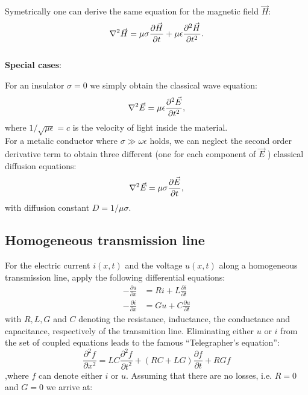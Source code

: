 \documentclass[10pt,a4paper]{report}
\def\vlap{\ensuremath\nabla^2}
\begin{document}
Symetrically one can derive the same equation for the magnetic field $\vec{H}$:
\begin{equation}
  \label{eq:magneticwavebase}
  \vlap\vec{H} =  \mu\sigma\frac{\partial \vec{H}}{\partial t}+\mu\epsilon \frac{\partial^2 \vec{H}}{\partial t^2}.
\end{equation}
\\

\textbf{Special cases}:

For an insulator $\sigma = 0$ we simply obtain the classical wave equation:
\begin{equation*}
  \vlap \vec{E} = \mu\epsilon \frac{\partial^2 \vec{E}}{\partial t^2},
\end{equation*}
where $1/\sqrt{\mu\epsilon} = c$ is the velocity of light inside the material. \\

For a metalic conductor where $\sigma \gg \omega \epsilon$ holds, we can neglect the second order derivative term to obtain three different (one for each component of $\vec{E}$ ) classical diffusion equations:
\begin{equation}
  \vlap \vec{E} = \mu\sigma \frac{\partial \vec{E}}{\partial t},
\end{equation}
with diffusion constant $D = 1/\mu\sigma$. 

\subsection{Homogeneous transmission line}
For the electric current $i(x,t)$ and the voltage $u(x,t)$ along a homogeneous transmission line, apply the following differential equations:
\begin{align}
  -\frac{\partial u}{\partial x} &= R i + L \frac{\partial i}{\partial t} \\
  -\frac{\partial i}{\partial x} &= G u + C \frac{\partial u}{\partial t} 
\end{align}
with $R, L , G $ and $C$ denoting the resistance, inductance, the conductance and capacitance, respectively of the transmition line. Eliminating either $u$ or $i$ from the set of coupled equations leads to the famous ``Telegrapher's equation'':
\begin{equation}
  \label{eq:telegrapherequation}
\frac{\partial^2 f}{\partial x^2} = LC\frac{\partial^2 f}{\partial t^2}+ (RC+LG)\frac{\partial f}{\partial t} + RG f
\end{equation}
,where $f$ can denote either $i$ or $u$. Assuming that there are no losses, i.e. $R = 0 $ and $G = 0$ we arrive at:
\end{document}
